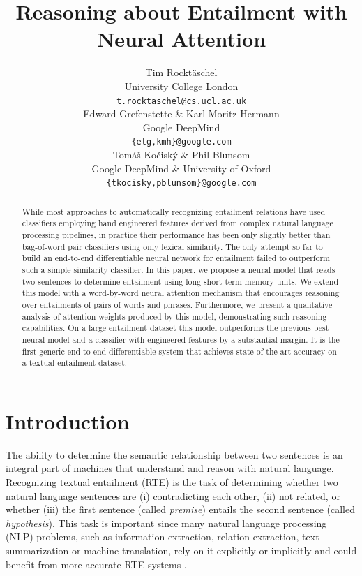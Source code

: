\documentclass{article}
\title{Reasoning about Entailment with \\Neural Attention}
\author{Tim Rockt\"aschel \\
 University College London \\
 \texttt{t.rocktaschel@cs.ucl.ac.uk} \\
 \And
 Edward Grefenstette \& Karl Moritz Hermann \\
 Google DeepMind \\
 \texttt{\{etg,kmh\}@google.com} \\
 \And
 Tom\'a\v{s} Ko\v{c}isk\'y \& Phil Blunsom \\
 Google DeepMind \& University of Oxford \\
 \texttt{\{tkocisky,pblunsom\}@google.com} \\
}
\begin{document}
\maketitle

\begin{abstract}
While most approaches to automatically recognizing entailment relations have used classifiers employing hand engineered features derived from complex natural language processing pipelines, in practice their performance has been only slightly better than bag-of-word pair classifiers using only lexical similarity. The only attempt so far to build an end-to-end differentiable neural network for entailment failed to outperform such a simple similarity classifier.
  In this paper, we propose a neural model that reads two sentences to determine entailment using long short-term memory units.
  We extend this model with a word-by-word neural attention mechanism that encourages reasoning over entailments of pairs of words and phrases.
  Furthermore, we present a qualitative analysis of attention weights produced by this model, demonstrating such reasoning capabilities.
  On a large entailment dataset this model outperforms the previous best neural model and a classifier with engineered features by a substantial margin.
  It is the first generic end-to-end differentiable system that achieves state-of-the-art accuracy on a textual entailment dataset.
\end{abstract}


\section{Introduction}
The ability to determine the semantic relationship between two sentences is an integral part of machines that understand and reason with natural language.
Recognizing textual entailment (RTE) is the task of determining whether two natural language sentences are (i) contradicting each other, (ii) not related, or whether (iii) the first sentence (called \emph{premise}) entails the second sentence (called \emph{hypothesis}).
This task is important since many natural language processing (NLP) problems, such as information extraction, relation extraction, text summarization or machine translation, rely on it explicitly or implicitly and could benefit from more accurate RTE systems \citep{dagan2006pascal}.
\end{document}
